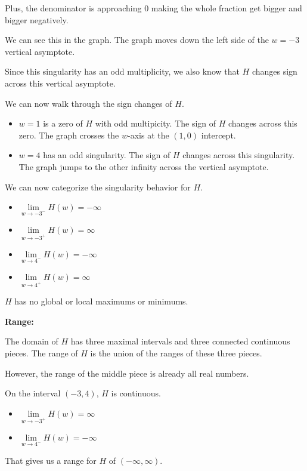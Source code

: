 \documentclass{ximera}
\begin{document}
\begin{example}
Plus, the denominator is approaching $0$ making the whole fraction get bigger and bigger negatively.

We can see this in the graph.  The graph moves down the left side of the $w=-3$ vertical asymptote.

Since this singularity has an odd multiplicity, we also know that $H$ changes sign across this vertical asymptote.


We can now walk through the sign changes of $H$.

\begin{itemize}
\item $w = 1$ is a zero of $H$ with odd multipicity.  The sign of $H$ changes across this zero. The graph crosses the $w$-axis at the $(1, 0)$ intercept.
\item $w = 4$ has an odd singularity. The sign of $H$ changes across this singularity.  The graph jumps to the other infinity across the vertical asymptote.
\end{itemize}



We can now categorize the singularity behavior for $H$.

\begin{itemize}
\item $\lim\limits_{w \to -3^-} H(w) = -\infty$
\item $\lim\limits_{w \to -3^+} H(w) = \infty$
\item $\lim\limits_{w \to 4^-} H(w) = -\infty$
\item $\lim\limits_{w \to 4^+} H(w) = \infty$
\end{itemize}

$H$ has no global or local maximums or minimums.





\textbf{Range:} 


The domain of $H$ has three maximal intervals and three connected continuous pieces.  The range of $H$ is the union of the ranges of these three pieces.

However, the range of the middle piece is already all real numbers.


On the interval $(-3, 4)$, $H$ is continuous.

\begin{itemize}
\item $\lim\limits_{w \to -3^+} H(w) = \infty$
\item $\lim\limits_{w \to 4^-} H(w) = -\infty$
\end{itemize}

That gives us a range for $H$ of $(-\infty, \infty )$.

\end{example}
\end{document}

